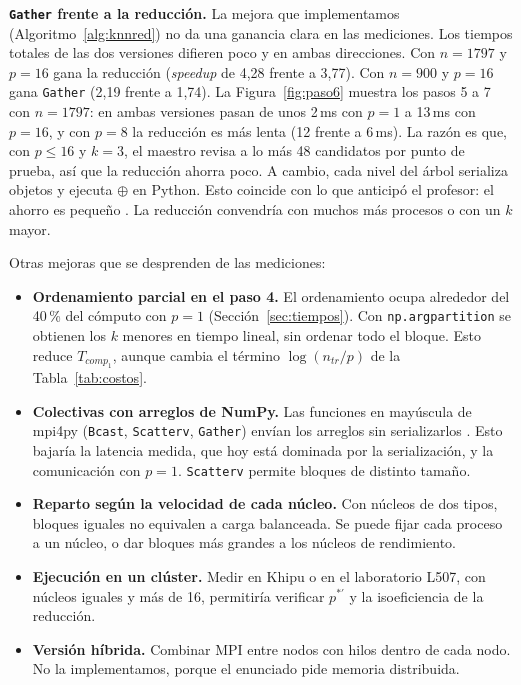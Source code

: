 \documentclass[11pt,a4paper]{article}
\newcommand{\ntr}{n_{tr}}
\newcommand{\tcomp}[1]{T_{comp_{#1}}}
\begin{document}
\textbf{\texttt{Gather} frente a la reducción.} La mejora que implementamos (Algoritmo~\ref{alg:knnred}) no da una ganancia clara en las mediciones. Los tiempos totales de las dos versiones difieren poco y en ambas direcciones. Con $n=1797$ y $p=16$ gana la reducción (\textit{speedup} de 4,28 frente a 3,77). Con $n=900$ y $p=16$ gana \texttt{Gather} (2,19 frente a 1,74). La Figura~\ref{fig:paso6} muestra los pasos 5 a 7 con $n=1797$: en ambas versiones pasan de unos 2\,ms con $p=1$ a 13\,ms con $p=16$, y con $p=8$ la reducción es más lenta (12 frente a 6\,ms). La razón es que, con $p\le 16$ y $k=3$, el maestro revisa a lo más 48 candidatos por punto de prueba, así que la reducción ahorra poco. A cambio, cada nivel del árbol serializa objetos y ejecuta $\oplus$ en Python. Esto coincide con lo que anticipó el profesor: el ahorro es pequeño \cite{correo-profesor}. La reducción convendría con muchos más procesos o con un $k$ mayor.

Otras mejoras que se desprenden de las mediciones:
\begin{itemize}
  \item \textbf{Ordenamiento parcial en el paso 4.} El ordenamiento ocupa alrededor del 40\,\% del cómputo con $p=1$ (Sección~\ref{sec:tiempos}). Con \texttt{np.argpartition} se obtienen los $k$ menores en tiempo lineal, sin ordenar todo el bloque. Esto reduce $\tcomp{1}$, aunque cambia el término $\log(\ntr/p)$ de la Tabla~\ref{tab:costos}.
  \item \textbf{Colectivas con arreglos de NumPy.} Las funciones en mayúscula de mpi4py (\texttt{Bcast}, \texttt{Scatterv}, \texttt{Gather}) envían los arreglos sin serializarlos \cite{mpi4py}. Esto bajaría la latencia medida, que hoy está dominada por la serialización, y la comunicación con $p=1$. \texttt{Scatterv} permite bloques de distinto tamaño.
  \item \textbf{Reparto según la velocidad de cada núcleo.} Con núcleos de dos tipos, bloques iguales no equivalen a carga balanceada. Se puede fijar cada proceso a un núcleo, o dar bloques más grandes a los núcleos de rendimiento.
  \item \textbf{Ejecución en un clúster.} Medir en Khipu o en el laboratorio L507, con núcleos iguales y más de 16, permitiría verificar $p^{*\prime}$ y la isoeficiencia de la reducción.
  \item \textbf{Versión híbrida.} Combinar MPI entre nodos con hilos dentro de cada nodo. No la implementamos, porque el enunciado pide memoria distribuida.
\end{itemize}
\end{document}
